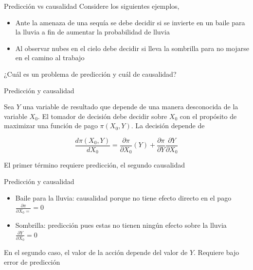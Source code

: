 \documentclass[aspectratio=169,xcolor=dvipsnames]{beamer}
\begin{document}
      \begin{frame}{Predicción vs causalidad}
        Considere los siguientes ejemplos, \cite{kleinberg2015prediction}
        \begin{itemize}
            \item Ante la amenaza de una sequía se debe decidir si se invierte en un baile para la lluvia a fin de aumentar la probabilidad de lluvia
            \item Al observar nubes en el cielo debe decidir si lleva la sombrilla para no mojarse en el camino al trabajo
        \end{itemize}

        ¿Cuál es un problema de predicción y cuál de causalidad?
    \end{frame}

    \begin{frame}{Predicción y causalidad}

    Sea $Y$ una variable de resultado que depende de una manera desconocida de la variable $X_0$. El tomador de decisión debe decidir sobre $X_0$ con el propósito de maximizar una función de pago $\pi(X_0,Y)$. La decisión depende de

    \begin{equation*}
        \dfrac{d\pi(X_0,Y)}{dX_0}=\dfrac{\partial\pi}{\partial X_0}(Y)+\dfrac{\partial \pi}{\partial Y}\dfrac{\partial Y}{\partial X_0}
    \end{equation*}

    El primer término requiere predicción, el segundo causalidad
        
    \end{frame}

    \begin{frame}{Predicción y causalidad}

    \begin{itemize}
        \item Baile para la lluvia: causalidad porque no tiene efecto directo en el pago $\frac{\partial \pi}{\partial X_0=}=0$
        \item Sombrilla: predicción pues estas no tienen ningún efecto sobre la lluvia $\frac{\partial Y}{\partial X_0}=0$
    \end{itemize}

    En el segundo caso, el valor de la acción depende del valor de $Y$. Requiere bajo error de predicción
        
    \end{frame}
\end{document}
